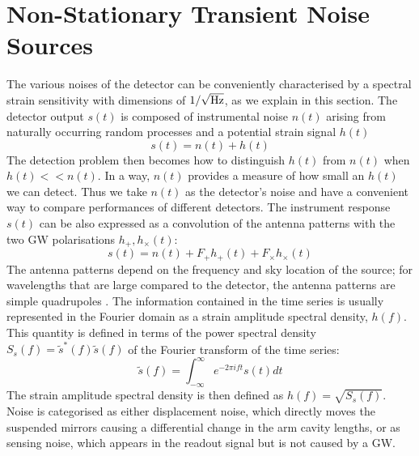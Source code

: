 \documentclass[binding=0.6cm, LaM]{sapthesis}
\begin{document}
\section{Non-Stationary Transient Noise Sources}
	The various noises of the detector can be conveniently characterised by a spectral strain
        sensitivity with dimensions of $1/\sqrt{{\rm Hz}}$, as we explain in this section. 
        The detector output $s(t)$ is composed of instrumental noise $n(t)$ arising from
        naturally occurring random processes and a potential strain signal $h(t)$
        \begin{equation}
          s(t) = n(t) + h(t)
        \end{equation}
        The detection problem then becomes how to distinguish $h(t)$ from $n(t)$ when $h(t) << n(t)$.
        In a way, $n(t)$ provides a measure of how small an $h(t)$ we can detect.
        Thus we take $n(t)$ as the detector’s noise and have a convenient way to
        compare performances of different detectors.
	The instrument response $s(t)$ can be also expressed as a convolution of the antenna patterns 
	with the two GW polarisations $h_{+}, h_{\times}(t)$:
        \begin{equation}
          s(t) = n(t) +  F_{+}h_{+} (t) + F_{\times}h_{\times}(t)
        \end{equation} 
	The antenna patterns depend on the frequency and sky location of the source; 
	for wavelengths that are large compared to the detector, the antenna patterns are simple quadrupoles \cite{19}.
	The information contained in the time series is usually represented in the Fourier domain 
	as a strain amplitude spectral density, $h(f)$.
	This quantity is defined in terms of the power spectral density $S_s(f) = \tilde s^{*}(f) \tilde s(f)$
	of the Fourier transform of the time series:
        \begin{equation}
          \tilde s(f) = \int^{\infty}_{-\infty} e^{-2 \pi ift} s(t)dt
        \end{equation}
	The strain amplitude spectral density is then defined as $h(f) = \sqrt{S_s(f)}$.
	Noise is categorised as either displacement noise, which directly moves the suspended mirrors
        causing a differential change in the arm cavity lengths, or as sensing noise,
        which appears in the readout signal but is not caused by a GW.
\end{document}
